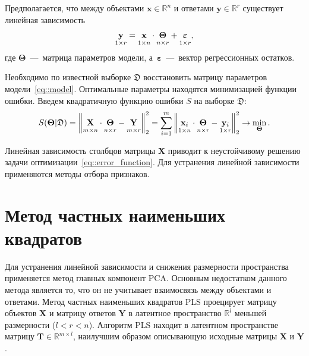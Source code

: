\documentclass[12pt,twoside]{article}
\newcommand{\bx}{\mathbf{x}}
\newcommand{\by}{\mathbf{y}}
\newcommand{\bY}{\mathbf{Y}}
\newcommand{\bX}{\mathbf{X}}
\newcommand{\bT}{\mathbf{T}}
\newcommand{\bTheta}{\boldsymbol{\Theta}}
\begin{document}
Предполагается, что между объектами $\bx \in \mathbb{R}^n$ и ответами $\by \in \mathbb{R}^r$ существует линейная зависимость 
\begin{equation}
 \underset{1 \times r}{\by} = \underset{1 \times n}{\vphantom{\by}\bx} \cdot \underset{n \times r}{\vphantom{\by}\bTheta} + \underset{1 \times r}{\vphantom{\by}\boldsymbol{\varepsilon}}, 
\label{eq::model}
\end{equation}
где $\bTheta$~---~матрица параметров модели, а~$\boldsymbol{\varepsilon}$~---~вектор регрессионных остатков.

Необходимо по известной выборке $\mathfrak{D}$ восстановить матрицу параметров модели~\eqref{eq::model}.
Оптимальные параметры находятся минимизацией функции ошибки.
Введем квадратичную функцию ошибки $S$ на выборке $\mathfrak{D}$:
\begin{equation}
	S(\bTheta | \mathfrak{D}) = {\left\| \underset{m \times n}{\vphantom{\by}\mathbf{X}} \cdot \underset{n \times r}{\vphantom{\by}\bTheta} - \underset{m \times r}{\vphantom{\by}\mathbf{Y}} \right\| }_2^2 = \sum_{i=1}^m \left\| \underset{1 \times n}{\vphantom{\by}\bx_i} \cdot \underset{n \times r}{\vphantom{\by}\bTheta} - \underset{1 \times r}{\vphantom{\by}\by_i} \right\|_2^2 \rightarrow\min_{\bTheta}.
\label{eq::error_function}
\end{equation}
 
Линейная зависимость столбцов матрицы $\bX$ приводит к неустойчивому решению задачи оптимизации~\eqref{eq::error_function}. Для устранения линейной зависимости применяются методы отбора признаков.

\section{Метод частных наименьших квадратов}

Для устранения линейной зависимости и снижения размерности пространства применяется метод главных компонент PCA. 
Основным недостатком данного метода является то, что он не учитывает взаимосвязь между объектами и ответами.
Метод частных наименьших квадратов PLS проецирует матрицу объектов $\bX$ и матрицу ответов $\bY$ в латентное пространство $\mathbb{R}^l$ меньшей размерности ($l < r < n$).
Алгоритм PLS находит в латентном пространстве матрицу $\bT \in \mathbb{R}^{m \times l}$, наилучшим образом описывающую исходные матрицы $\bX$ и $\bY$.
\end{document}
